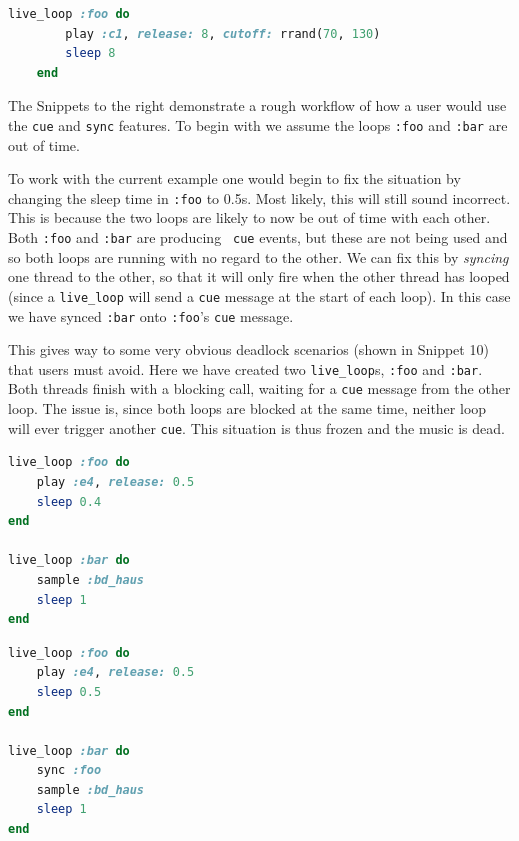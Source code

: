 \documentclass[11pt]{scrartcl}
\begin{document}
\begin{minipage}{\textwidth}
	\begin{lstlisting}[language = ruby]
    live_loop :foo do
        play :c1, release: 8, cutoff: rrand(70, 130)
        sleep 8
    end
	\end{lstlisting}
\end{minipage}

\clearpage
\begin{multicols}{2}
The Snippets to the right demonstrate a rough workflow of how a user would use 
the \texttt{cue} and \texttt{sync} features. To begin with we assume the loops 
\texttt{:foo} and \texttt{:bar} are out of time.

To work with the current example one would begin to fix the situation by 
changing the sleep time in \texttt{:foo} to 0.5s. Most likely, this will still 
sound incorrect. This is because the two loops are likely to now be out of 
time with each other. Both \texttt{:foo} and \texttt{:bar} are producing \texttt{
cue} events, but these are not being used and so both loops are running with 
no regard to the other. We can fix this by \emph{syncing} one thread to the 
other, so that it will only fire when the other thread has looped (since
a \texttt{live\_loop} will send a \texttt{cue} message at the start of each loop).
In this case we have synced \texttt{:bar} onto \texttt{:foo}'s \texttt{cue} 
message.

This gives way to some very obvious deadlock scenarios (shown in Snippet 10) 
that users must avoid. Here we have created two \texttt{live\_loop}s, \texttt{:foo}
and \texttt{:bar}. Both threads finish with a blocking call, waiting for a
\texttt{cue} message from the other loop. The issue is, since both loops are blocked
at the same time, neither loop will ever trigger another \texttt{cue}. This
situation is thus frozen and the music is dead.

	\begin{minipage}{0.5\textwidth}

		\begin{minipage}{\textwidth}
			\begin{lstlisting}[language = ruby]
live_loop :foo do
    play :e4, release: 0.5
    sleep 0.4
end

live_loop :bar do
    sample :bd_haus
    sleep 1
end
			\end{lstlisting}
		\end{minipage}

		\begin{minipage}{\textwidth}
			\begin{lstlisting}[language = ruby]
live_loop :foo do
    play :e4, release: 0.5
    sleep 0.5
end

live_loop :bar do
    sync :foo
    sample :bd_haus
    sleep 1
end
			\end{lstlisting}
		\end{minipage}

	\end{minipage}
\end{multicols}
\end{document}
